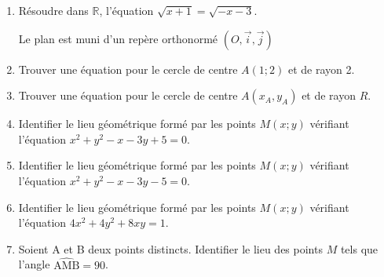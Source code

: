 \documentclass{book}
\begin{document}

\fontsize{10}{12}\selectfont

\begin{enumerate}
 \item Résoudre dans $\mathbb{R}$, l'équation $\sqrt{x+1}=\sqrt{-x-3}$.
 
 Le plan est muni d'un repère orthonormé $(O, \vec{i},\vec{j})$
 \item Trouver une équation pour le cercle de centre $A(1;2)$ et de rayon 2.
 \item Trouver une équation pour le cercle de centre $A(x_A,y_A)$ et de rayon $R$.
 \item Identifier le lieu géométrique formé par les points $M(x;y)$ vérifiant l'équation
 $x^2+y^2-x-3y+5=0$.
 \item Identifier le lieu géométrique formé par les points $M(x;y)$ vérifiant l'équation
 $x^2+y^2-x-3y-5=0$.
 \item Identifier le lieu géométrique formé par les points $M(x;y)$ vérifiant l'équation
 $4x^2+4y^2+8xy=1$.
 \item Soient A et B deux points distincts. Identifier le lieu des points $M$ tels que l'angle $\widehat{\mathrm{AMB}}= 90$\degre.
\end{enumerate}
\end{document}
